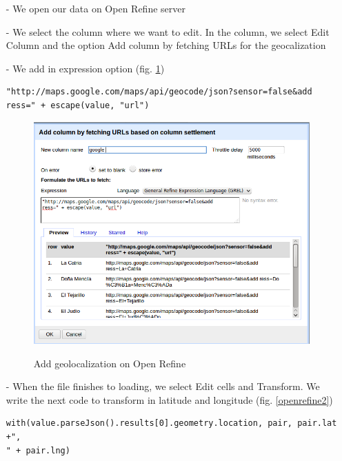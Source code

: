 \documentclass[10pt,a4paper]{article}
\begin{document}
\begin{itemize}
\item[-] We open our data on Open Refine server
\item[-] We select the column where we want to edit. In the column, we select Edit Column and the option Add column by fetching URLs for the geocalization
\item[-]We add in expression option (fig. \ref{openrefine1}) 
\begin{verbatim}
"http://maps.google.com/maps/api/geocode/json?sensor=false&add
ress=" + escape(value, "url")
\end{verbatim}

\begin{figure}[hdp]
\centering
\includegraphics[scale=0.50]{openrefine1.png}
\label{openrefine1}
\caption{Add geolocalization on Open Refine}
\end{figure}

\item[-] When the file finishes to loading,  we select Edit cells and Transform. We write the next code to transform in latitude and longitude (fig. \ref{openrefine2})
\begin{verbatim}
with(value.parseJson().results[0].geometry.location, pair, pair.lat +",
" + pair.lng)
\end{verbatim}


\end{itemize}
\end{document}
